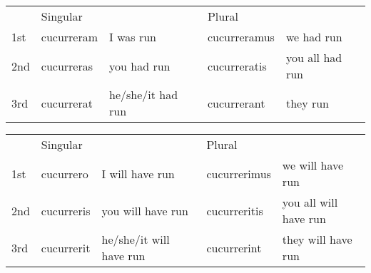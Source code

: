 \begin{center}  
  \begin{tabular}{lllll}
    \centering
    & Singular & & Plural &  \\
    1st & cucurreram & I was run & cucurreramus & we had run \\
    2nd & cucurreras & you had run & cucurreratis & you all had run \\ 
    3rd & cucurrerat & he/she/it had run & cucurrerant & they run \\
  \end{tabular}
\end{center}


\begin{center}  
  \begin{tabular}{lllll}
    \centering
    & Singular & & Plural &  \\
    1st & cucurrero & I will have run & cucurrerimus & we will have run\\
    2nd & cucurreris & you will have run & cucurreritis & you all will have run\\ 
    3rd & cucurrerit & he/she/it will have run & cucurrerint & they will have run \\ 
  \end{tabular}
\end{center}

